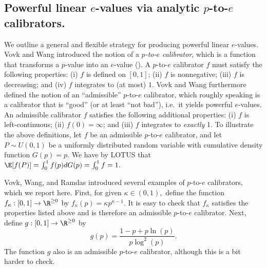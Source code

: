 \documentclass[12pt]{article}
\begin{document}
\subsection*{Powerful linear $e$-values via analytic $p$-to-$e$ calibrators.}
We outline a general and flexible strategy for producing powerful linear $e$-values. Vovk and Wang introduced the notion of a \textit{$p$-to-$e$ calibrator}, which is a function that transforms a $p$-value into an $e$-value (\cite{Vovk2021b}). A $p$-to-$e$ calibrator $f$ must satisfy the following properties: (i) $f$ is defined on $[0,1]$; (ii) $f$ is nonnegative; (iii) $f$ is decreasing; and (iv) $f$ integrates to (at most) $1$. Vovk and Wang furthermore defined the notion of an ``admissible'' $p$-to-$e$ calibrator, which roughly speaking is a calibrator that is ``good'' (or at least ``not bad''), i.e.\ it yields powerful $e$-values.  An admissible calibrator $f$ satisfies the following additional properties: (i) $f$ is left-continuous; (ii) $f(0) = \infty$; and (iii) $f$ integrates to \textit{exactly} 1. To illustrate the above definitions, let $f$ be an admissible $p$-to-$e$ calibrator, and let $P \sim U(0,1)$ be a uniformly distributed random variable with cumulative density function $G(p) = p$. We have by LOTUS that $\E[f(P)] = \int_{0}^1 f(p) d G(p) = \int_0^1 f = 1.$ 

Vovk, Wang, and Ramdas introduced several examples of $p$-to-$e$ calibrators, which we report here. First, for given $\kappa \in (0,1),$ define the function $f_\kappa : [0,1] \to \R^{\geq 0}$ by $f_\kappa(p) = \kappa p^{\kappa-1}$. It is easy to check that $f_\kappa$ satisfies the properties listed above and is therefore an admissible $p$-to-$e$ calibrator. Next, define $g: [0,1] \to \R^{\geq 0}$ by
$$ g(p) = \frac{1 - p + p \ln(p)}{ p \log^2(p)}.$$ The function $g$ also is an admissible $p$-to-$e$ calibrator, although this is a bit harder to check.
\end{document}
